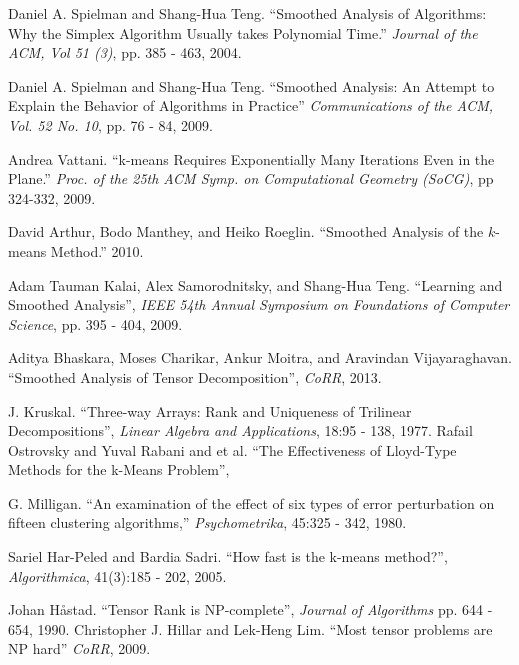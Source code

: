\documentclass[11pt]{article}
\theoremstyle{definition}
\begin{document}
\begin{thebibliography}{1}
    Daniel A. Spielman and Shang{-}Hua Teng.
    ``Smoothed Analysis of Algorithms: Why the Simplex Algorithm Usually takes Polynomial Time.''
    \emph{Journal of the ACM, Vol 51 (3)},
    pp. 385 - 463,
    2004.

    Daniel A. Spielman and Shang{-}Hua Teng.
    ``Smoothed Analysis: An Attempt to Explain the Behavior of Algorithms in Practice''
    \emph{Communications of the ACM, Vol. 52 No. 10},
    pp. 76 - 84,
    2009.

    Andrea Vattani.
    ``k-means Requires Exponentially Many Iterations Even in the Plane.'' 
    \emph{ Proc. of the 25th ACM Symp. on Computational Geometry (SoCG)}, 
    pp 324-332, 
    2009.
    
    David Arthur, Bodo Manthey, and Heiko Roeglin.
    ``Smoothed Analysis of the $k$-means Method.''
    2010.

    Adam Tauman Kalai, Alex Samorodnitsky, and Shang{-}Hua Teng.
    ``Learning and Smoothed Analysis'',
    \emph{IEEE 54th Annual Symposium on Foundations of Computer Science}, 
    pp. 395 - 404,
    2009.

    Aditya Bhaskara, Moses Charikar, Ankur Moitra, and Aravindan Vijayaraghavan.
    ``Smoothed Analysis of Tensor Decomposition'',
    \emph{CoRR},
    2013.

    J. Kruskal. 
    ``Three-way Arrays: Rank and Uniqueness of Trilinear Decompositions'',
    \emph{Linear Algebra and Applications}, 
    18:95 - 138, 
    1977.
    Rafail Ostrovsky and Yuval Rabani and et al.
    ``The Effectiveness of Lloyd-Type Methods for the k-Means Problem'',

    G. Milligan. 
    ``An examination of the effect of six types of error perturbation on fifteen clustering
    algorithms,'' 
    \emph{Psychometrika}, 
    45:325 - 342, 1980.

    Sariel Har{-}Peled and Bardia Sadri.
    ``How fast is the k-means method?'',
    \emph{Algorithmica},
    41(3):185 - 202,
    2005.
    
    Johan H{\aa}stad.
    ``Tensor Rank is NP-complete'',
    \emph{Journal of Algorithms}
    pp. 644 - 654,
    1990.
    Christopher J. Hillar and Lek{-}Heng Lim.
    ``Most tensor problems are {NP} hard''
    \emph{CoRR},
    2009.
\end{thebibliography}
\end{document}
